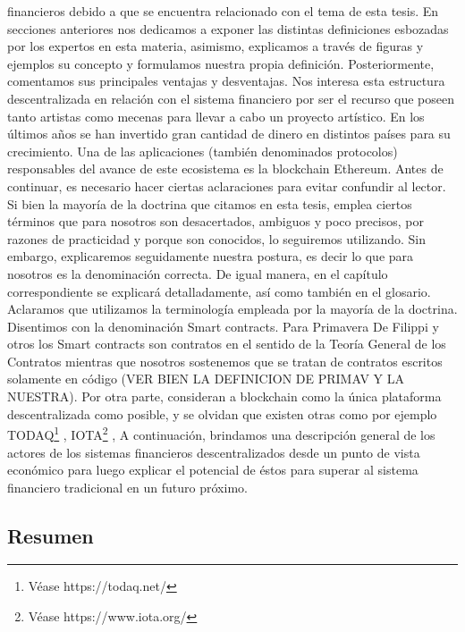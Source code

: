 \documentclass[12pt]{report} %
\begin{document}
financieros debido a que se encuentra relacionado con el tema de esta tesis. En secciones anteriores nos dedicamos a exponer las distintas definiciones esbozadas por los expertos en esta materia, asimismo, explicamos a través de figuras y ejemplos su concepto y formulamos nuestra propia definición. Posteriormente, comentamos sus principales ventajas y desventajas. Nos interesa esta estructura descentralizada en relación con el sistema financiero por ser el recurso que poseen tanto artistas como mecenas para llevar a cabo un proyecto artístico. 
En los últimos años se han invertido gran cantidad de dinero en distintos países para su crecimiento. Una de las aplicaciones (también denominados protocolos) responsables del avance de este ecosistema es la blockchain Ethereum.
Antes de continuar, es necesario hacer ciertas aclaraciones para evitar confundir al lector. Si bien la mayoría de la doctrina que citamos en esta tesis, emplea ciertos términos que para nosotros son desacertados, ambiguos y poco precisos, por razones de practicidad y porque son conocidos, lo seguiremos utilizando. Sin embargo, explicaremos seguidamente nuestra postura, es decir lo que para nosotros es la denominación correcta. De igual manera, en el capítulo correspondiente se explicará detalladamente, así como también en el glosario. Aclaramos que utilizamos la terminología empleada por la mayoría de la doctrina. Disentimos con la denominación Smart contracts. Para Primavera De Filippi y otros los Smart contracts son contratos en el sentido de la Teoría General de los Contratos mientras que nosotros sostenemos que se tratan de contratos escritos solamente en código (VER BIEN LA DEFINICION DE PRIMAV Y LA NUESTRA). Por otra parte, consideran a blockchain como la única plataforma descentralizada como posible, y se olvidan que existen otras como por ejemplo TODAQ\footnote{Véase https://todaq.net/} , IOTA\footnote{Véase https://www.iota.org/} , 
A continuación, brindamos una descripción general de los actores de los sistemas financieros descentralizados desde un punto de vista económico para luego explicar el potencial de éstos para superar al sistema financiero tradicional en un futuro próximo. 











\subsection{Resumen}
\end{document}
